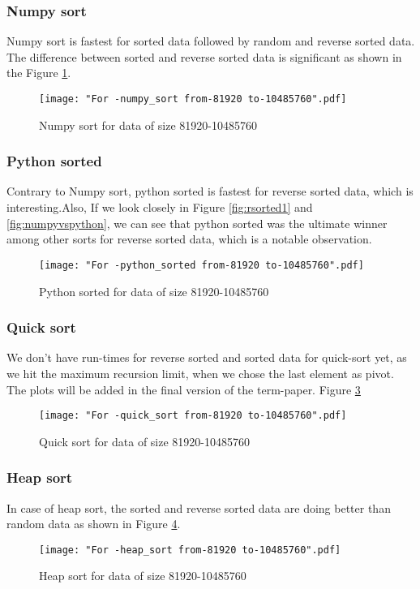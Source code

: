 \documentclass[sigconf, nonacm, natbib, screen, balance=False]{acmart}
\begin{document}
\subsubsection{Numpy sort}
Numpy sort is fastest for sorted data followed by random and reverse sorted data. The difference between sorted and reverse sorted data is significant as shown in the Figure \ref{fig:numpysort}.

\begin{figure}[ht]
\texttt{[image: "For -numpy\_sort from-81920 to-10485760".pdf]}
    \caption{Numpy sort for data of size 81920-10485760 }
    \label{fig:numpysort}
\end{figure}

\subsubsection{Python sorted}
Contrary to Numpy sort, python sorted is fastest for reverse sorted data, which is interesting.Also, If we look closely in Figure \ref{fig:rsorted1} and \ref{fig:numpyvspython}, we can see that python sorted was the ultimate winner among other sorts for reverse sorted data, which is a notable observation.

\begin{figure}[ht]
\texttt{[image: "For -python\_sorted from-81920 to-10485760".pdf]}
    \caption{Python sorted for data of size 81920-10485760 }
    \label{fig:pythonsorted}
\end{figure}

\subsubsection{Quick sort}
We don't have run-times for reverse sorted and sorted data for quick-sort yet, as we hit the maximum recursion limit, when we chose the last element as pivot. The plots will be added in the final version of the term-paper. Figure \ref{fig:quicksort}

\begin{figure}[ht]
\texttt{[image: "For -quick\_sort from-81920 to-10485760".pdf]}
    \caption{Quick sort for data of size 81920-10485760 }
    \label{fig:quicksort}
\end{figure}

\subsubsection{Heap sort}
In case of heap sort, the sorted and reverse sorted data are doing better than random data as shown in Figure \ref{fig:heapsort}.
\begin{figure}[ht]
\texttt{[image: "For -heap\_sort from-81920 to-10485760".pdf]}
    \caption{Heap sort for data of size 81920-10485760 }
    \label{fig:heapsort}
\end{figure}
\end{document}
